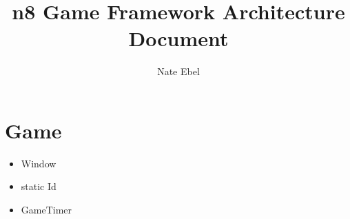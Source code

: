 \documentclass[12pt]{article}
\begin{document}
\title{n8 Game Framework Architecture Document}
\author{Nate Ebel}

\maketitle

\tableofcontents


\section{Game}
\begin{itemize}
	\item Window
	\item static Id
	\item GameTimer
\end{itemize}

	
\end{document}
